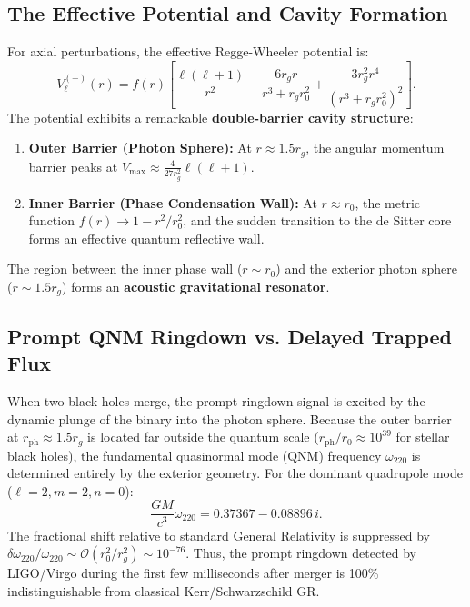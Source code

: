 \documentclass[11pt,a4paper]{article}
\begin{document}
\subsection{The Effective Potential and Cavity Formation}
For axial perturbations, the effective Regge-Wheeler potential is:
\begin{equation}
V_{\ell}^{(-)}(r) = f(r) \left[ \frac{\ell(\ell+1)}{r^2} - \frac{6 r_g r}{r^3 + r_g r_0^2} + \frac{3 r_g^2 r^4}{(r^3 + r_g r_0^2)^2} \right].
\end{equation}
The potential exhibits a remarkable \textbf{double-barrier cavity structure}:
\begin{enumerate}
    \item \textbf{Outer Barrier (Photon Sphere):} At $r \approx 1.5 r_g$, the angular momentum barrier peaks at $V_{\max} \approx \frac{4}{27 r_g^2} \ell(\ell+1)$.
    \item \textbf{Inner Barrier (Phase Condensation Wall):} At $r \approx r_0$, the metric function $f(r) \to 1 - r^2/r_0^2$, and the sudden transition to the de Sitter core forms an effective quantum reflective wall.
\end{enumerate}
The region between the inner phase wall ($r \sim r_0$) and the exterior photon sphere ($r \sim 1.5 r_g$) forms an \textbf{acoustic gravitational resonator}.

\subsection{Prompt QNM Ringdown vs. Delayed Trapped Flux}
When two black holes merge, the prompt ringdown signal is excited by the dynamic plunge of the binary into the photon sphere. 
Because the outer barrier at $r_{\mathrm{ph}} \approx 1.5 r_g$ is located far outside the quantum scale ($r_{\mathrm{ph}} / r_0 \approx 10^{39}$ for stellar black holes), the fundamental quasinormal mode (QNM) frequency $\omega_{220}$ is determined entirely by the exterior geometry.
For the dominant quadrupole mode ($\ell = 2, m = 2, n = 0$):
\begin{equation}
\frac{G M}{c^3} \omega_{220} = 0.37367 - 0.08896\, i.
\end{equation}
The fractional shift relative to standard General Relativity is suppressed by $\delta \omega_{220}/\omega_{220} \sim \mathcal{O}(r_0^2 / r_g^2) \sim 10^{-76}$. Thus, the prompt ringdown detected by LIGO/Virgo during the first few milliseconds after merger is 100\% indistinguishable from classical Kerr/Schwarzschild GR.
\end{document}

